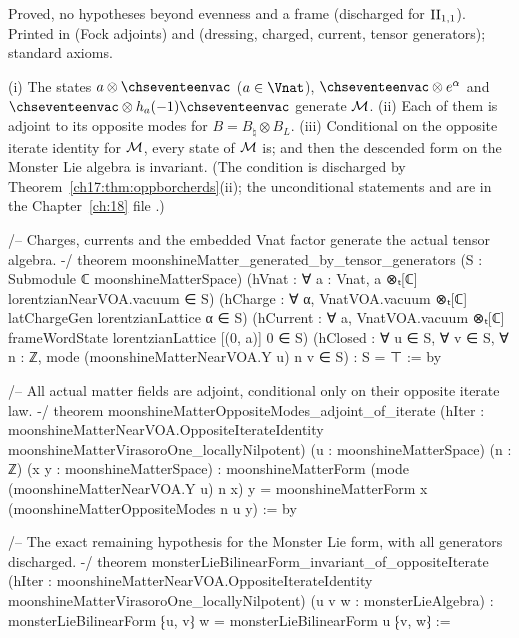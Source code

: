 \begin{status}
Proved, no hypotheses beyond evenness and a frame (discharged for ${\mathrm{II}_{1,1}}$).  Printed in
 (Fock adjoints) and 
(dressing, charged, current, tensor generators); standard axioms.
\end{status}

\begin{theorem}\label{ch17:thm:matterfhl}
(i) The states $a\otimes\chseventeenvac$ ($a\in\Vnat$), $\chseventeenvac\otimes e^\alpha$ and $\chseventeenvac\otimes h_a(-1)\chseventeenvac$ generate $\mathcal{M}$.
(ii) Each of them is adjoint to its opposite modes for $B=B_\natural\otimes B_L$.
(iii) Conditional on the opposite iterate identity for $\mathcal{M}$, every state of $\mathcal{M}$ is; and then the descended form
on the Monster Lie algebra is invariant.  (The condition is discharged by Theorem~\ref{ch17:thm:oppborcherds}(ii); the
unconditional statements  and  are in the
Chapter~\ref{ch:18} file .)
\end{theorem}

\begin{leancode}
/-- Charges, currents and the embedded Vnat factor generate the actual tensor algebra. -/
theorem moonshineMatter_generated_by_tensor_generators (S : Submodule ℂ moonshineMatterSpace)
    (hVnat : ∀ a : Vnat, a ⊗ₜ[ℂ] lorentzianNearVOA.vacuum ∈ S)
    (hCharge : ∀ α, VnatVOA.vacuum ⊗ₜ[ℂ] latChargeGen lorentzianLattice α ∈ S)
    (hCurrent : ∀ a, VnatVOA.vacuum ⊗ₜ[ℂ]
      frameWordState lorentzianLattice [(0, a)] 0 ∈ S)
    (hClosed : ∀ u ∈ S, ∀ v ∈ S, ∀ n : ℤ,
      mode (moonshineMatterNearVOA.Y u) n v ∈ S) : S = ⊤ := by

/-- All actual matter fields are adjoint, conditional only on their opposite iterate law. -/
theorem moonshineMatterOppositeModes_adjoint_of_iterate
    (hIter : moonshineMatterNearVOA.OppositeIterateIdentity
      moonshineMatterVirasoroOne_locallyNilpotent)
    (u : moonshineMatterSpace) (n : ℤ) (x y : moonshineMatterSpace) :
    moonshineMatterForm (mode (moonshineMatterNearVOA.Y u) n x) y =
      moonshineMatterForm x (moonshineMatterOppositeModes n u y) := by

/-- The exact remaining hypothesis for the Monster Lie form, with all generators discharged. -/
theorem monsterLieBilinearForm_invariant_of_oppositeIterate
    (hIter : moonshineMatterNearVOA.OppositeIterateIdentity
      moonshineMatterVirasoroOne_locallyNilpotent)
    (u v w : monsterLieAlgebra) :
    monsterLieBilinearForm ⁅u, v⁆ w = monsterLieBilinearForm u ⁅v, w⁆ :=
\end{leancode}

